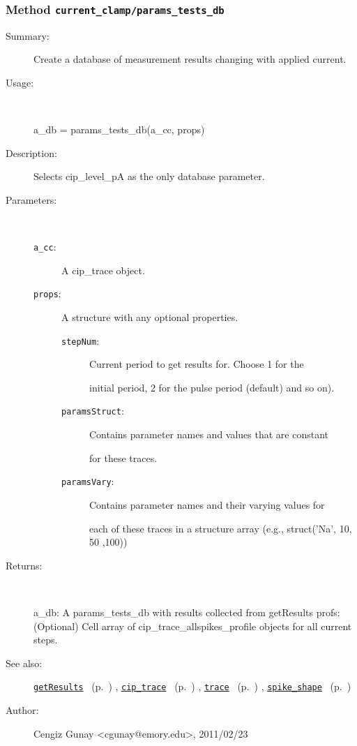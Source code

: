 \subsubsection[Method \texttt{params\_tests\_db}]{Method \texttt{current\_clamp/params\_tests\_db}}%
%
\label{ref_current_clamp__params_tests_db}%
\hypertarget{ref_current_clamp__params_tests_db}{}%
\begin{description}
\item[Summary:]Create a database of measurement results changing with applied current.
%
\item[Usage:]~%
\begin{lyxcode}%
a\_db = params\_tests\_db(a\_cc, props)
%
\end{lyxcode}%
%
\item[Description:]%
Selects cip\_level\_pA as the only database parameter. 
\item[Parameters:]~
\begin{description}%
\item[\texttt{a\_cc}:]
 A cip\_trace object.
\item[\texttt{props}:]
 A structure with any optional properties.
\begin{description}%
\item[\texttt{stepNum}:]
 Current period to get results for. Choose 1 for the

initial period, 2 for the pulse period (default) and so on).
\item[\texttt{paramsStruct}:]
 Contains parameter names and values that are constant

for these traces.
\item[\texttt{paramsVary}:]
 Contains parameter names and their varying values for

each of these traces in a structure array (e.g.,
struct('Na', {10, 50 ,100}))
\end{description}%
\end{description}%
%
\item[Returns:
]~

   a\_db: A params\_tests\_db with results collected from getResults
   profs: (Optional) Cell array of cip\_trace\_allspikes\_profile objects for all current steps.
%
%
\item[See also:]%
\hyperlink{ref_getResults}{\texttt{getResults}}%
\ (p.~\pageref{ref_getResults})%
%
, \hyperlink{ref_cip_trace}{\texttt{cip\_trace}}%
\ (p.~\pageref{ref_cip_trace})%
%
, \hyperlink{ref_trace}{\texttt{trace}}%
\ (p.~\pageref{ref_trace})%
%
, \hyperlink{ref_spike_shape}{\texttt{spike\_shape}}%
\ (p.~\pageref{ref_spike_shape})%
%
%
\item[Author:]%
Cengiz Gunay <cgunay@emory.edu>, 2011/02/23
%
\end{description}
\methodline%
